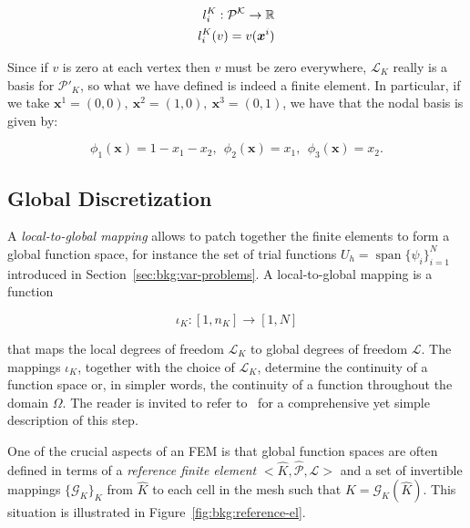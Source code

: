 \begin{equation}
\centering
\begin{split}
l_i^K : \mathcal{P^K} \rightarrow \mathbb{R} \\
l_i^K(v) = v(\boldsymbol{x}^i)
\end{split}
\end{equation}

Since if $v$ is zero at each vertex then $v$ must be zero everywhere, $\mathcal{L}_K$ really is a basis for $\mathcal{P}'_K$, so what we have defined is indeed a finite element. In particular, if we take $\boldsymbol{x}^1 = (0, 0),\ \boldsymbol{x}^2 = (1,0),\ \boldsymbol{x}^3 = (0,1)$, we have that the nodal basis is given by:

\begin{equation}
\phi_1(\boldsymbol{x}) = 1 - x_1 - x_2,\ \ \phi_2(\boldsymbol{x}) = x_1,\ \ \phi_3(\boldsymbol{x}) = x_2.
\end{equation}


\subsection{Global Discretization}
\label{sec:bkg:refel}
A {\em local-to-global mapping} allows to patch together the finite elements to form a global function space, for instance the set of trial functions $U_h = \operatorname{span}\lbrace \psi_i \rbrace_{i=1}^N$ introduced in Section~\ref{sec:bkg:var-problems}. A local-to-global mapping is a function

\begin{equation}
\iota_K : [1,n_K] \rightarrow [1,N]
\end{equation}

that maps the local degrees of freedom $\mathcal{L}_K$ to global degrees of freedom $\mathcal{L}$. The mappings $\iota_K$, together with the choice of $\mathcal{L}_K$, determine the continuity of a function space or, in simpler words, the continuity of a function throughout the domain $\Omega$. The reader is invited to refer to~\cite{fenics-book} for a comprehensive yet simple description of this step.

One of the crucial aspects of an FEM is that global function spaces are often defined in terms of a {\em reference finite element} ${<}\hat{K}, \hat{\mathcal{P}}, \hat{\mathcal{L}}{>}$ and a set of invertible mappings $\lbrace \mathcal{G}_K\rbrace_{K}$ from $\hat{K}$ to each cell in the mesh such that $K = \mathcal{G}_K(\hat{K})$.  This situation is illustrated in Figure~\ref{fig:bkg:reference-el}.

